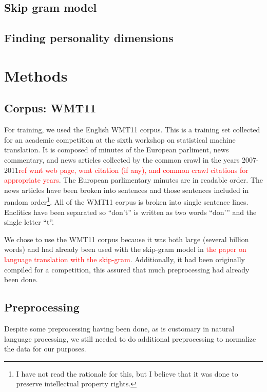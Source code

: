 \documentclass[10pt,letterpaper]{book}
\newcommand{\todo}[1]{\textcolor{red}{#1}}
\begin{document}
\section{Skip gram model}

\section{Finding personality dimensions}

\chapter{Methods}

\section{Corpus: WMT11}

For training, we used the English WMT11 corpus. This is a training set collected for an academic competition at the sixth workshop on statistical machine translation. It is composed of minutes of the European parliment, news commentary, and news articles collected by the common crawl in the years 2007-2011\todo{ref wmt web page, wmt citation (if any), and common crawl citations for appropriate years}. The European parlimentary minutes are in readable order. The news articles have been broken into sentences and those sentences included in random order\footnote{I have not read the rationale for this, but I believe that it was done to preserve intellectual property rights.}. All of the WMT11 corpus is broken into single sentence lines. Enclitics have been separated so ``don't'' is written as two words ``don'\phantom{}'' and the single letter ``t''.

We chose to use the WMT11 corpus because it was both large (several billion words) and had already been used with the skip-gram model in \todo{the paper on language translation with the skip-gram}. Additionally, it had been originally compiled for a competition, this assured that much preprocessing had already been done.

\section{Preprocessing}

Despite some preprocessing having been done, as is customary in natural language processing, we still needed to do additional preprocessing to normalize the data for our purposes.
\end{document}
